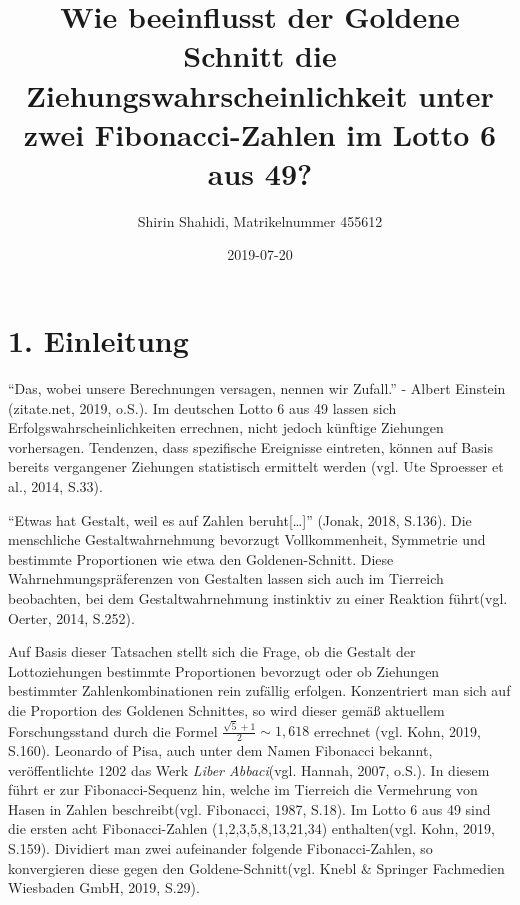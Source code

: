 \documentclass[ngerman,]{article}
\title{Wie beeinflusst der Goldene Schnitt die Ziehungswahrscheinlichkeit unter
zwei Fibonacci-Zahlen im Lotto 6 aus 49?}
\author{Shirin Shahidi, Matrikelnummer 455612}
\date{2019-07-20}
\begin{document}
\maketitle

{
\setcounter{tocdepth}{2}
\tableofcontents
}
\newpage

\section{1. Einleitung}\label{einleitung}

``Das, wobei unsere Berechnungen versagen, nennen wir Zufall.'' - Albert
Einstein (zitate.net, 2019, o.S.). Im deutschen Lotto 6 aus 49 lassen
sich Erfolgswahrscheinlichkeiten errechnen, nicht jedoch künftige
Ziehungen vorhersagen. Tendenzen, dass spezifische Ereignisse eintreten,
können auf Basis bereits vergangener Ziehungen statistisch ermittelt
werden (vgl. Ute Sproesser et al., 2014, S.33).

``Etwas hat Gestalt, weil es auf Zahlen beruht{[}\ldots{}{]}'' (Jonak,
2018, S.136). Die menschliche Gestaltwahrnehmung bevorzugt
Vollkommenheit, Symmetrie und bestimmte Proportionen wie etwa den
Goldenen-Schnitt. Diese Wahrnehmungspräferenzen von Gestalten lassen
sich auch im Tierreich beobachten, bei dem Gestaltwahrnehmung instinktiv
zu einer Reaktion führt(vgl. Oerter, 2014, S.252).

Auf Basis dieser Tatsachen stellt sich die Frage, ob die Gestalt der
Lottoziehungen bestimmte Proportionen bevorzugt oder ob Ziehungen
bestimmter Zahlenkombinationen rein zufällig erfolgen. Konzentriert man
sich auf die Proportion des Goldenen Schnittes, so wird dieser gemäß
aktuellem Forschungsstand durch die Formel
\(\frac{\sqrt{5} + 1}{2}\sim1,618\) errechnet (vgl. Kohn, 2019, S.160).
Leonardo of Pisa, auch unter dem Namen Fibonacci bekannt,
veröffentlichte 1202 das Werk \emph{Liber Abbaci}(vgl. Hannah, 2007,
o.S.). In diesem führt er zur Fibonacci-Sequenz hin, welche im Tierreich
die Vermehrung von Hasen in Zahlen beschreibt(vgl. Fibonacci, 1987,
S.18). Im Lotto 6 aus 49 sind die ersten acht Fibonacci-Zahlen
(1,2,3,5,8,13,21,34) enthalten(vgl. Kohn, 2019, S.159). Dividiert man
zwei aufeinander folgende Fibonacci-Zahlen, so konvergieren diese gegen
den Goldene-Schnitt(vgl. Knebl \& Springer Fachmedien Wiesbaden GmbH,
2019, S.29).
\end{document}
